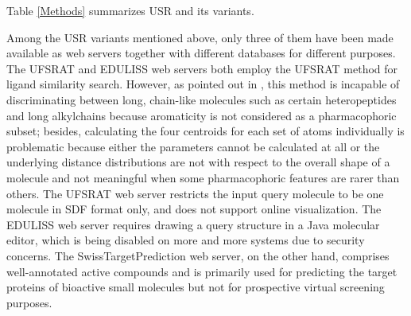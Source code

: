 \documentclass[a4,center,fleqn]{NAR}
\begin{document}
Table \ref{Methods} summarizes USR and its variants.

\begin{table*}
{}%
\end{table*}

Among the USR variants mentioned above, only three of them \cite{1436,1437,1408} have been made available as web servers together with different databases for different purposes. The UFSRAT \cite{1436} and EDULISS \cite{1437} web servers both employ the UFSRAT \cite{1436} method for ligand similarity search. However, as pointed out in \cite{1331}, this method is incapable of discriminating between long, chain-like molecules such as certain heteropeptides and long alkylchains because aromaticity is not considered as a pharmacophoric subset; besides, calculating the four centroids for each set of atoms individually is problematic because either the parameters cannot be calculated at all or the underlying distance distributions are not with respect to the overall shape of a molecule and not meaningful when some pharmacophoric features are rarer than others. The UFSRAT \cite{1436} web server restricts the input query molecule to be one molecule in SDF format only, and does not support online visualization. The EDULISS \cite{1437} web server requires drawing a query structure in a Java molecular editor, which is being disabled on more and more systems due to security concerns. The SwissTargetPrediction \cite{1408} web server, on the other hand, comprises well-annotated active compounds and is primarily used for predicting the target proteins of bioactive small molecules but not for prospective virtual screening purposes.
\end{document}
